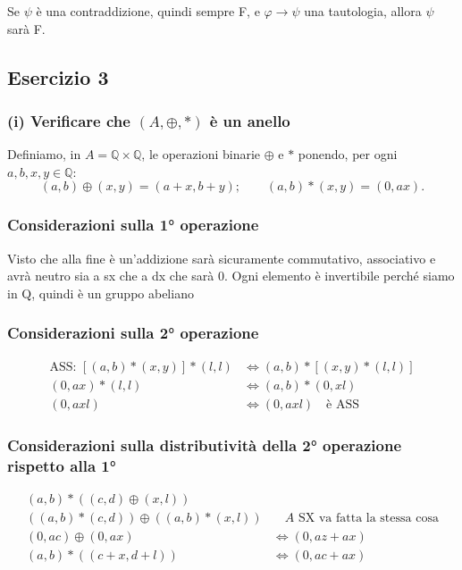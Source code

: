 Se $\psi$ è una contraddizione, quindi sempre F, e $\varphi \to \psi$ una tautologia, allora $\psi$ sarà F.

\subsection*{Esercizio 3}

\subsubsection*{(i) Verificare che $(A, \oplus, *)$ è un anello}

Definiamo, in $A = \mathbb{Q} \times \mathbb{Q}$, le operazioni binarie $\oplus$ e $*$ ponendo, per ogni $a, b, x, y \in \mathbb{Q}$:
$$(a,b) \oplus (x,y) = (a+x, b+y); \qquad (a,b) * (x,y) = (0, ax).$$

\subsubsection*{Considerazioni sulla 1° operazione}

Visto che alla fine è un'addizione sarà sicuramente commutativo, associativo e avrà neutro sia a sx che a dx che sarà 0. Ogni elemento è invertibile perché siamo in Q, quindi è un gruppo abeliano

\subsubsection*{Considerazioni sulla 2° operazione}

\begin{align*}
\text{ASS: } [(a,b) * (x,y)] * (l,l) &\Leftrightarrow (a,b) * [(x,y) * (l,l)] \\
(0, ax) * (l,l) &\Leftrightarrow (a,b) * (0, xl) \\
(0, axl) &\Leftrightarrow (0, axl) \quad \text{è ASS}
\end{align*}

\subsubsection*{Considerazioni sulla distributività della 2° operazione rispetto alla 1°}

\begin{align*}
(a,b) * ((c,d) \oplus (x,l)) \\
((a,b) * (c,d)) \oplus ((a,b) * (x,l)) &\quad A \text{ SX va fatta la stessa cosa} \\
(0, ac) \oplus (0, ax) &\Leftrightarrow (0, az + ax) \\
(a,b) * ((c+x, d+l)) &\Leftrightarrow (0, ac + ax)
\end{align*}

